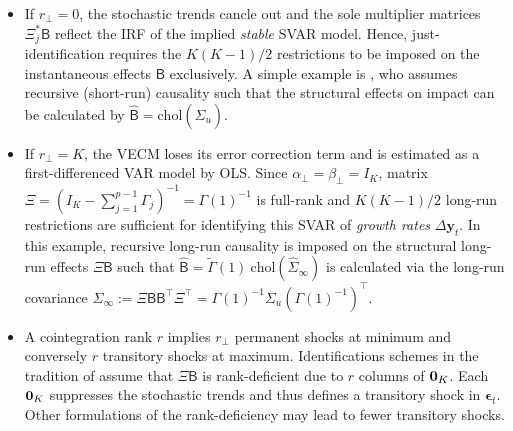 \begin{itemize}
	\item If $ r_\perp = 0 $, the stochastic trends cancle out and the sole multiplier matrices $ \Xi_j^* \mathsf{B} $ reflect the IRF of the implied \textit{stable} SVAR model. Hence, just-identification requires the $ K(K-1)/2 $ restrictions to be imposed on the instantaneous effects $\mathsf{B} $ exclusively. A simple example is \cite{Sims1980}, who assumes recursive (short-run) causality such that the structural effects on impact can be calculated by $ \widehat{\textsf{B}} = \text{chol} \left( \widehat{\Sigma}_{u} \right) $.
	
	\item If $ r_\perp = K $, the VECM loses its error correction term and is estimated as a first-differenced VAR model by OLS. Since $ \alpha_\perp = \beta_\perp = I_K $, matrix $ \Xi = \left(I_K - \sum_{j=1}^{p-1} \Gamma_{j} \right)^{-1} = \Gamma(1)^{-1} $ is full-rank and $ K(K-1)/2 $ long-run restrictions are sufficient for identifying this SVAR of \textit{growth rates} $ \Delta \boldsymbol{y}_{t} $. In this example, recursive long-run causality is imposed on the structural long-run effects $ \Xi \mathsf{B} $ such that $ \widehat{\textsf{B}} = \widetilde{\Gamma}(1) \ \text{chol}\left( \widehat{\Sigma}_{\infty} \right) $ is calculated via the long-run covariance $ \Sigma_\infty := \Xi \mathsf{B} \mathsf{B}^\top\Xi^\top = \Gamma(1)^{-1} \Sigma_u \left( \Gamma(1)^{-1} \right)^\top$. 
	
	\item A cointegration rank $ r $ implies $ r_\perp $ permanent shocks at minimum and conversely $ r $ transitory shocks at maximum. Identifications schemes in the tradition of \citet{KingEtAl1991} assume that $ \Xi \mathsf{B} $ is rank-deficient due to $ r $ columns of $ {\bf 0}_K $. Each $ {\bf 0}_K $ suppresses the stochastic trends and thus defines a transitory shock in $ \boldsymbol{\epsilon}_{t} $. Other formulations of the rank-deficiency may lead to fewer transitory shocks.
\end{itemize} 


